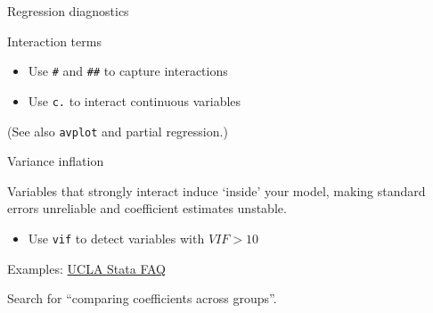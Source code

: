 \documentclass[t]{beamer}
\begin{document}
	\begin{frame}[t]{Regression diagnostics}

		\begin{block}{Interaction terms}

			\begin{itemize}
				\item Use \texttt{\#} and \texttt{\#\#} to capture interactions
				\item Use \texttt{c.} to interact continuous variables
			\end{itemize}
			
			(See also \texttt{avplot} and partial regression.)
		\end{block}

		\begin{alertblock}{Variance inflation}

			Variables that strongly interact induce  `inside' your model, making standard errors unreliable and coefficient estimates unstable.
			\begin{itemize}
				\item 	 Use \texttt{vif} to detect variables with $VIF > 10$
			\end{itemize}
			


		\end{alertblock}

		\begin{exampleblock}{Examples: \href{http://www.ats.ucla.edu/stat/stata/faq/}{UCLA Stata FAQ}}

			Search for ``comparing coefficients across groups''.

		\end{exampleblock}
					
	\end{frame}

\end{document}
